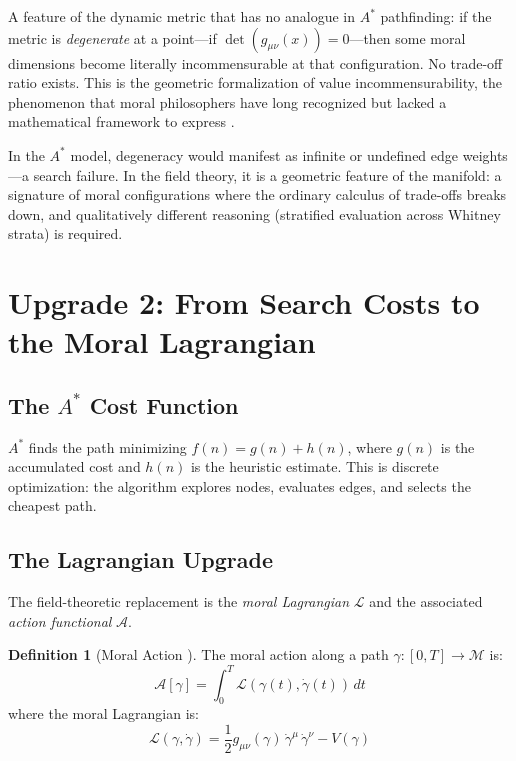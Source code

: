 \documentclass[12pt]{article}
\theoremstyle{definition}
\newtheorem{definition}[theorem]{Definition}
\theoremstyle{remark}
\newcommand{\M}{\mathcal{M}}
\newcommand{\Lag}{\mathcal{L}}
\newcommand{\Act}{\mathcal{A}}
\begin{document}
A feature of the dynamic metric that has no analogue in $A^*$ pathfinding: if the metric is \emph{degenerate} at a point---if $\det(g_{\mu\nu}(x)) = 0$---then some moral dimensions become literally incommensurable at that configuration. No trade-off ratio exists. This is the geometric formalization of value incommensurability, the phenomenon that moral philosophers have long recognized but lacked a mathematical framework to express \citep{chang1997, raz1986}.

In the $A^*$ model, degeneracy would manifest as infinite or undefined edge weights---a search failure. In the field theory, it is a geometric feature of the manifold: a signature of moral configurations where the ordinary calculus of trade-offs breaks down, and qualitatively different reasoning (stratified evaluation across Whitney strata) is required.


\section{Upgrade 2: From Search Costs to the Moral Lagrangian}
\label{sec:lagrangian}

\subsection{The $A^*$ Cost Function}

$A^*$ finds the path minimizing $f(n) = g(n) + h(n)$, where $g(n)$ is the accumulated cost and $h(n)$ is the heuristic estimate. This is discrete optimization: the algorithm explores nodes, evaluates edges, and selects the cheapest path.

\subsection{The Lagrangian Upgrade}

The field-theoretic replacement is the \emph{moral Lagrangian} $\Lag$ and the associated \emph{action functional} $\Act$.

\begin{definition}[Moral Action {\citep[\S11.4]{anonymous2026ge}}]
The moral action along a path $\gamma: [0,T] \to \M$ is:
\begin{equation}
\Act[\gamma] = \int_0^T \Lag(\gamma(t), \dot{\gamma}(t))\, dt
\end{equation}
where the moral Lagrangian is:
\begin{equation}\label{eq:lagrangian}
\Lag(\gamma, \dot{\gamma}) = \frac{1}{2} g_{\mu\nu}(\gamma)\, \dot{\gamma}^\mu\, \dot{\gamma}^\nu - V(\gamma)
\end{equation}
\end{definition}
\end{document}
